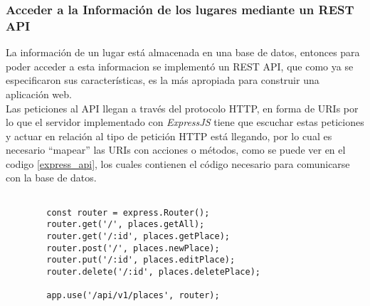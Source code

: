 %
%
%
%



\subsubsection{Acceder a la Información de los lugares mediante un REST API }


La información de un lugar está almacenada en una base de datos, entonces para poder acceder a esta informacion se implement\'o un REST API, que como ya se especificaron sus características, es la más apropiada para construir una aplicación web. \\

Las peticiones al API llegan a través del protocolo HTTP, en forma de URIs por lo que el servidor implementado con \emph{ExpressJS} tiene que escuchar estas peticiones y actuar en relación al tipo de petición HTTP está llegando, por lo cual es necesario ``mapear'' las URIs con acciones o métodos, como se puede ver en el codigo \ref{express_api}, los cuales contienen el código necesario para comunicarse con la base de datos. \\


\begin{center}
  \begin{lstlisting}[label=express_api,caption=Declarando API REST con ExpressJS]

        const router = express.Router();
        router.get('/', places.getAll);
        router.get('/:id', places.getPlace);
        router.post('/', places.newPlace);
        router.put('/:id', places.editPlace);
        router.delete('/:id', places.deletePlace);

        app.use('/api/v1/places', router);

  \end{lstlisting}
\end{center}


